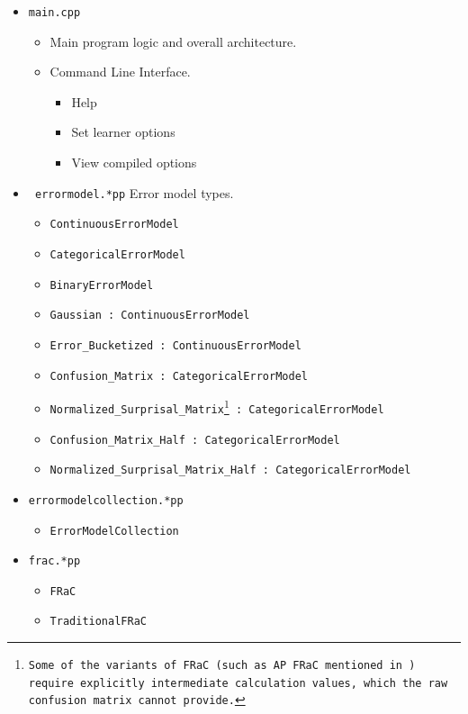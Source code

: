 \documentclass{article}
\newcommand{\extends}[1]{ : \textcolor{superclass}{#1}}
\newcommand{\filename}[1]{\texttt{\color{filename}#1}}
\begin{document}
\begin{multicols}{2}
\begin{itemize}
\item \texttt{main.cpp}
\begin{itemize}
\item Main program logic and overall architecture.
\item Command Line Interface.
\begin{itemize}
\item Help
\item Set learner options
\item View compiled options
\end{itemize}
\end{itemize}
\item \filename{ errormodel.*pp} Error model types.
\begin{itemize}
\item \texttt{\color{abstract}ContinuousErrorModel}
\item \texttt{\color{abstract}CategoricalErrorModel}
\item \texttt{\color{abstract}BinaryErrorModel}
\item \texttt{Gaussian\extends{ContinuousErrorModel}}
\item \texttt{Error\_Bucketized\extends{ContinuousErrorModel}}
\item \texttt{Confusion\_Matrix\extends{CategoricalErrorModel}}
\item \texttt{Normalized\_Surprisal\_Matrix\footnote{Some of the variants of FRaC (such as AP FRaC mentioned in \cite{frac11}) require explicitly intermediate calculation values, which the raw confusion matrix cannot provide.}\extends{CategoricalErrorModel}} %
\item \texttt{Confusion\_Matrix\_Half\extends{CategoricalErrorModel}}
\item \texttt{Normalized\_Surprisal\_Matrix\_Half\extends{CategoricalErrorModel}}
\end{itemize}
\item \filename{errormodelcollection.*pp}
\begin{itemize}
\item \texttt{ErrorModelCollection} %
\end{itemize}
\item \filename{frac.*pp}
\begin{itemize}
\item \texttt{\color{abstract}FRaC}
\item \texttt{TraditionalFRaC}

\end{itemize}
\end{itemize}
\end{multicols}
\end{document}
